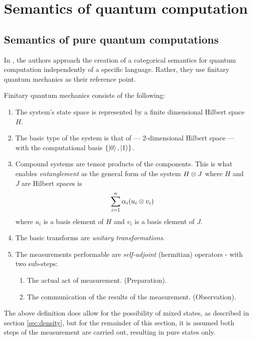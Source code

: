 \section{Semantics of quantum computation}%
\label{sec:semanticsquantum}

\subsection{Semantics of pure quantum computations}\label{sec:puresemantics}
In \cite{abramsky04:catsemquantprot}, the authors approach the creation of a categorical semantics
for quantum computation independently of a specific language. Rather, they use finitary quantum
mechanics as their reference point.

Finitary quantum mechanics consists of the following:
\begin{enumerate}
  \item The system's state space is represented by a finite dimensional Hilbert space $H$.
    \label{lis:qfm1}
  \item The basic type of the system is that of \qubit --- 2-dimensional Hilbert space --- with the
    computational basis $\{\left\vert{0}\right\rangle, \left\vert{1}\right\rangle\}$.\label{lis:qfm2}
  \item Compound systems are tensor products of the components. This is what enables
    \emph{entanglement} as the general form of the system $H\otimes J$ where $H$ and $J$ are Hilbert
    spaces is
    \[
      \sum_{i=1}^{n}\alpha_{i} (u_{i} \otimes v_{i})
    \]
    where $u_{i}$ is a basis element of $H$ and $v_{i}$ is a basis element of $J$.\label{lis:qfm3}
  \item The basic transforms are \emph{unitary transformations}. \label{lis:qfm4}
  \item The measurements performable are \emph{self-adjoint} (hermitian) operators - with two
    sub-steps:\label{lis:qfm5}
    \begin{enumerate}
      \item The actual act of measurement. (Preparation).\label{lis:qfm5a}
      \item The communication of the results of the measurement. (Observation).\label{lis:qfm5b}
    \end{enumerate}
\end{enumerate}
The above definition does allow for the possibility of mixed states, as described in section
\ref{sec:density}, but for the remainder of this section, it is assumed both steps of the
measurement are carried out, resulting in pure states only.

